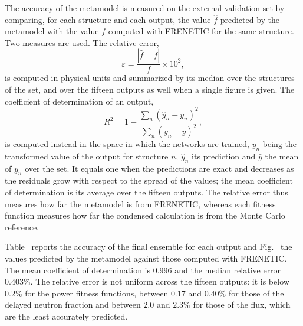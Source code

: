 The accuracy of the metamodel is measured on the external validation set by
comparing, for each structure and each output, the value $\hat{f}$ predicted by
the metamodel with the value $f$ computed with FRENETIC for the same structure.
Two measures are used. The relative error,
%
\begin{equation}
  \varepsilon = \frac{\left|\hat{f}-f\right|}{f}\times10^{2},
  \label{eg:eqn:relerr}
\end{equation}
%
is computed in physical units and summarized by its median over the structures
of the set, and over the fifteen outputs as well when a single figure is given.
The coefficient of determination of an output,
%
\begin{equation}
  R^2 = 1-\frac{\sum_{n}\left(\hat{y}_n-y_n\right)^2}
               {\sum_{n}\left(y_n-\bar{y}\right)^2},
  \label{eg:eqn:r2}
\end{equation}
%
is computed instead in the space in which the networks are trained, $y_n$ being
the transformed value of the output for structure $n$, $\hat{y}_n$ its
prediction and $\bar{y}$ the mean of $y_n$ over the set. It equals one when the
predictions are exact and decreases as the residuals grow with respect to the
spread of the values; the mean coefficient of determination is its average over
the fifteen outputs. The relative error thus measures how far the metamodel is
from FRENETIC, whereas each fitness function measures how far the condensed
calculation is from the Monte Carlo reference.

Table~ reports the accuracy of the final ensemble for each
output and Fig.~ the values predicted by the metamodel
against those computed with FRENETIC. The mean coefficient of determination is
$0.996$ and the median relative error $0.403\%$. The relative error is not
uniform across the fifteen outputs: it is below $0.2\%$ for the power fitness
functions, between $0.17$ and $0.40\%$ for those of the delayed neutron fraction
and between $2.0$ and $2.3\%$ for those of the flux, which are the least
accurately predicted.

